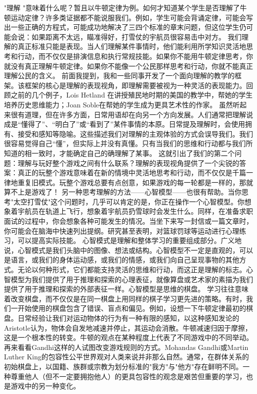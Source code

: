 "理解 "意味着什么呢？暂且以牛顿定律为例。如何才知道某个学生是否理解了牛顿运动定律？许多类证据都不能说服我们。例如，学生可能会背诵定律，可能会写出一些正确的方程式，可能成功地解决了三四个标准的章末问题，但这位学生仍可能会说：如果距离不太远，瞄准得好，打雪仗的宇航员很容易击中对方。
我们理解的真正标准只能是表现。当人们理解某件事情时，他们能利用所学知识灵活地思考和行动，而不仅仅是排演信息和执行常规技能。如果你不能用牛顿定律思考，你就没有真正理解牛顿定律。如果你不能像一个公民那样思考和行动，你就不能真正理解公民的含义。
前面我提到，我和一些同事开发了一个面向理解的教学的框架。该框架的核心是理解的表现视角，即理解需要被视为一种灵活的表现能力。回顾之前的几个例子，Lois Hetland 在讲授殖民地时期的美国的教学中，帮她的学生培养历史思维能力；Joan Soble在帮她的学生成为更具艺术性的作家。
虽然听起来很有道理，但在许多方面，日常用语却在向另一个方向发展。人们通常把理解说成是“懂得了”、“明白了”或“看到了”某件事情的本原。日常提及理解时，会使用拥有、接受和感知等隐喻。这些描述我们对理解的主观体验的方式会误导我们。我们很容易觉得自己“懂”，但实际上并没有真懂。只有当我们的思维和行动都与我们所知道的相一致时，才能确定自己的确理解了某事。
这就引出了我们的第二个问题：理解与玩好整个游戏之间有什么联系？理解的表现视角提供了一个尖锐的答案：真正的玩整个游戏意味着在新的情境中灵活地思考和行动，而不仅仅是千篇一律地重复旧模式。玩整个游戏总要有点创意，如果游戏的每一轮都是一样的，那就算不上是游戏了！
另一种思考理解的方法——心智模型——也很有帮助。当你思考"太空打雪仗"这个问题时，几乎可以肯定的是，你正在操作一个心智模型。你想象着宇航员在轨道上飞行，想象着宇航员扔雪球时会发生什么。同样，在准备求职面试的过程中，你会想象各种可能发生的情况。当坐下来写一封信或一篇文章时，你可能会在脑海中快速列出提纲。研究甚至表明，对篮球罚球等运动进行心理练习，可以提高实际技能。
心智模式是理解和整体学习的重要组成部分。广义地说，心智模式是我们头脑中的图像、想法或结构。心智模型不一定是直观的，可以是语言，或我们的身体运动感，或我们的情感，或我们向自己呈现事物的其他方式。无论以何种形式，它们都能支持灵活的思维和行动，而这正是理解的标志。心智模型为我们提供了用于推理和探索的心理表征，就像算盘或艺术家的素描为我们提供了用于推理和探索的外部表征一样。心智模型是思维的棋盘。
学习往往意味着改变棋盘，而不仅仅是在同一棋盘上用同样的棋子学习更先进的策略。有时，我们一开始使用的棋盘包含了错误、盲点和偏见。例如，设想一下牛顿定律最初的棋盘。日常经验让我们对运动物体的行为有一种有限的感知，以这种感知发论的Aristotle认为，物体会自发地减速并停止，其运动会消散。牛顿减速归因于摩擦，这是一个根本性的转变。牛顿的观点在某种程度上代表了不同游戏中的不同举动。再来看看Gandhi这样的人试图改变游戏规则的方式。Mohandas Gandhi或Martin Luther King的包容性公平世界观对人类来说并非那么自然。通常，在群体关系的初始棋盘上，以国籍、族群或宗教为划分标准的"我方"与"他方"存在鲜明不同。一种尊重他人（但不一定要拥抱他人）的更具包容性的观念是艰苦但重要的学习，也是游戏中的另一种变化。
